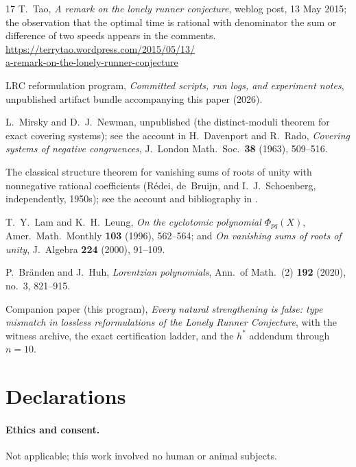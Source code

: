 \documentclass[11pt,a4paper]{article}
\numberwithin{equation}{section}
\theoremstyle{plain}
\theoremstyle{plain}
\theoremstyle{definition}
\theoremstyle{remark}
\begin{document}
\begin{thebibliography}{17}
T.~Tao,
\emph{A remark on the lonely runner conjecture},
weblog post, 13 May 2015; the observation that the optimal time is
rational with denominator the sum or difference of two speeds appears
in the comments.
\\[2pt]
\url{https://terrytao.wordpress.com/2015/05/13/}\\
\url{a-remark-on-the-lonely-runner-conjecture}

LRC reformulation program,
\emph{Committed scripts, run logs, and experiment notes},
unpublished artifact bundle accompanying this paper (2026).

L.~Mirsky and D.~J.~Newman,
unpublished (the distinct-moduli theorem for exact covering systems);
see the account in
H.~Davenport and R.~Rado,
\emph{Covering systems of negative congruences},
J.\ London Math.\ Soc.\ \textbf{38} (1963), 509--516.

The classical structure theorem for vanishing sums of roots of unity
with nonnegative rational coefficients (R\'edei, de~Bruijn, and
I.~J.~Schoenberg, independently, 1950s); see the account and
bibliography in \cite{LamLeung}.

T.~Y.~Lam and K.~H.~Leung,
\emph{On the cyclotomic polynomial $\Phi_{pq}(X)$},
Amer.\ Math.\ Monthly \textbf{103} (1996), 562--564; and
\emph{On vanishing sums of roots of unity},
J.\ Algebra \textbf{224} (2000), 91--109.

P.~Br\"anden and J.~Huh,
\emph{Lorentzian polynomials},
Ann.\ of Math.\ (2) \textbf{192} (2020), no.~3, 821--915.

Companion paper (this program),
\emph{Every natural strengthening is false: type mismatch in lossless
reformulations of the Lonely Runner Conjecture},
with the witness archive, the exact certification ladder, and the
$h^*$ addendum through $n=10$.

\end{thebibliography}
\endgroup


\section*{Declarations}

\paragraph{Ethics and consent.} Not applicable; this work involved no
human or animal subjects.
\end{document}
